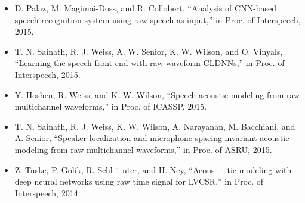 \documentclass{article}
\begin{document}
	\begin{itemize}
		\item D. Palaz, M. Magimai-Doss, and R. Collobert, “Analysis of CNN-based speech recognition system using raw
		speech as input,” in Proc. of Interspeech, 2015.
		
		\item T. N. Sainath, R. J. Weiss, A. W. Senior, K. W. Wilson,
		and O. Vinyals, “Learning the speech front-end with raw
		waveform CLDNNs,” in Proc. of Interspeech, 2015.
		
		\item Y. Hoshen, R. Weiss, and K. W. Wilson, “Speech acoustic modeling from raw multichannel waveforms,” in
		Proc. of ICASSP, 2015.
		
		\item T. N. Sainath, R. J. Weiss, K. W. Wilson, A. Narayanan,
		M. Bacchiani, and A. Senior, “Speaker localization and
		microphone spacing invariant acoustic modeling from
		raw multichannel waveforms,” in Proc. of ASRU, 2015.
		
		\item Z. Tuske, P. Golik, R. Schl ¨ uter, and H. Ney, “Acous- ¨
		tic modeling with deep neural networks using raw time
		signal for LVCSR,” in Proc. of Interspeech, 2014.
	\end{itemize}
\end{document}

